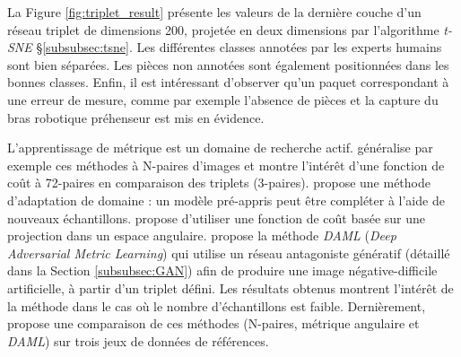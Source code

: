 La Figure \ref{fig:triplet_result} présente les valeurs de la dernière couche d'un réseau triplet de dimensions 200, projetée en deux dimensions par l'algorithme \textit{t-SNE} §\ref{subsubsec:tsne}.
Les différentes classes annotées par les experts humains sont bien séparées.
Les pièces non annotées sont également positionnées dans les bonnes classes.
Enfin, il est intéressant d'observer qu'un paquet correspondant à une erreur de mesure, comme par exemple l'absence de pièces et la capture du bras robotique préhenseur est mis en évidence.

L'apprentissage de métrique est un domaine de recherche actif.
\cite{sohn_improved_2016} généralise par exemple ces méthodes à N-paires d'images et montre l'intérêt d'une fonction de coût à 72-paires en comparaison des triplets (3-paires).
\cite{song_deep_2015} propose une méthode d'adaptation de domaine : un modèle pré-appris peut être compléter à l'aide de nouveaux échantillons.
\cite{wang_deep_2017} propose d'utiliser une fonction de coût basée sur une projection dans un espace angulaire.
\cite{duan_deep_2018} propose la méthode \textit{DAML} (\textit{Deep Adversarial Metric Learning}) qui utilise un réseau antagoniste génératif (détaillé dans la Section \ref{subsubsec:GAN}) afin de produire une image négative-difficile artificielle, à partir d'un triplet défini.
Les résultats obtenus montrent l'intérêt de la méthode dans le cas où le nombre d'échantillons est faible.
Dernièrement, \cite{zheng_hardness-aware_2019} propose une comparaison de ces méthodes (N-paires, métrique angulaire et \textit{DAML}) sur trois jeux de données de références.






